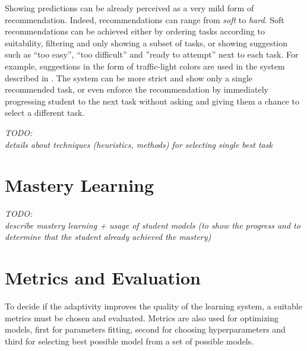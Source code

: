 Showing predictions can be already perceived as a very mild form of recommendation.
Indeed, recommendations can range from \emph{soft} to \emph{hard}.
Soft recommendations can be achieved either by
  ordering tasks according to suitability,
  filtering and only showing a subset of tasks,
  or showing suggestion such as
  ``too easy'', ``too difficult'' and ''ready to attempt'' next to each task.
For example, suggestions in the form of traffic-light colors
  are used in the system described in \cite{its-programming}.
The system can be more strict and show only a single recommended task,
  or even enforce the recommendation by immediately progressing student to
  the next task without asking and giving them a chance to select a different task.

\bigskip
\emph{TODO:\\details about techniques (heuristics, methods) for selecting single best task}


\section{Mastery Learning}
\label{sec:mastery-learning}

\emph{TODO:\\describe mastery learning + usage of student models%
(to show the progress and to determine that the student already achieved the mastery)}



\section{Metrics and Evaluation}
\label{sec:metrics-and-evaluation}


To decide if the adaptivity improves the quality of the learning system,
  a suitable metrics must be chosen and evaluated.
Metrics are also used for optimizing models,
  first for parameters fitting, second for choosing hyperparameters
  and third for selecting best possible model from a set of possible models.


